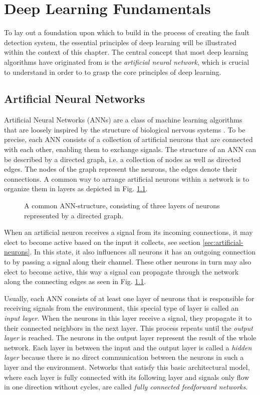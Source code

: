 \chapter{Deep Learning Fundamentals}

To lay out a foundation upon which to build in the process of creating
the fault detection system, the essential principles of deep learning
will be illustrated within the context of this chapter. The central
concept that most deep learning algorithms have originated from is the
\textit{artificial neural network}, which is crucial to understand in
order to to grasp the core principles of deep learning.

\section{Artificial Neural Networks}

Artificial Neural Networks (ANNs) are a class of machine learning algorithms
that are loosely inspired by the structure of biological nervous
systems \cite{Haykin}.
To be precise, each ANN consists of a collection of artificial neurons
that are connected with each other, enabling them to exchange signals.
The structure of an ANN can be described by a directed graph, i.e. a
collection of nodes as well as
directed edges. The nodes of the graph represent the neurons, the
edges denote their connections.
A common way to arrange artificial neurons within a network is to organize
them in layers as depicted in Fig. \ref{fig:basic-network}.
\begin{figure}[h]
  \centering
  \resizebox{0.75\textwidth}{!}{}
  \caption{A common ANN-structure, consisting of three layers of
    neurons represented by a directed graph.}
  \label{fig:basic-network}
\end{figure}

When an artificial neuron receives a signal from its
incoming connections, it may elect to become active based on the input
it collects, see section \ref{sec:artificial-neurons}.
In this state, it also influences all neurons it has an outgoing
connection to by passing a signal along their
channel. These other neurons in turn may also elect to become
active, this way a signal can propagate through the network along
the connecting edges as seen in Fig. \ref{fig:basic-network}.

Usually, each ANN consists of at least one layer of neurons that is
responsible for receiving signals from the environment, this special
type of layer is called an \textit{input layer}.
When the neurons in this layer receive a signal, they propagate it
to their connected neighbors in the next layer. This process repeats
until the \textit{output layer} is reached. The neurons in the output
layer represent the result of the whole network. Each layer in between
the input and the output layer is called a \textit{hidden layer}
because there is no direct communication between the neurons in
such a layer and the environment. Networks that satisfy this basic
architectural model, where each layer is fully connected with its
following layer and signals only flow in one direction without cycles,
are called
\textit{fully connected feedforward networks}.

